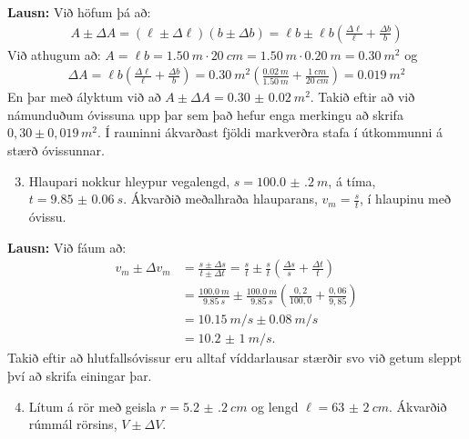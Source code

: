 \ifdefined \wholebook \else\documentclass[oneside]{book}\usepackage{EdlBook}\graphicspath{{figures/}}
\begin{document}
\textbf{Lausn:} Við höfum þá að:
\begin{align*}
    A \pm \Delta A = (\ell \pm \Delta \ell)(b \pm \Delta b) = \ell b \pm \ell b \left( \frac{\Delta \ell}{\ell} + \frac{\Delta b}{b} \right)
\end{align*}
Við athugum að: $A = \ell b = \SI{1,50}{m} \cdot \SI{20}{cm} = \SI{1,50}{m} \cdot \SI{0.20}{m} = \SI{0.30}{m^2}$ og
\begin{align*}
    \Delta A = \ell b \left( \frac{\Delta \ell}{\ell} + \frac{\Delta b}{b} \right) = \SI{0.30}{m^2} \left( \frac{\SI{0.02}{m}}{\SI{1.50}{m}} + \frac{\SI{1}{cm}}{\SI{20}{cm}} \right) = \SI{0.019}{m^2}
\end{align*}
En þar með ályktum við að $A \pm \Delta A = \SI{0.30(2)}{m^2}$. Takið eftir að við námunduðum óvissuna upp þar sem það hefur enga merkingu að skrifa $0,30 \pm 0,019 \, \si{m^2}$. Í rauninni ákvarðast fjöldi markverðra stafa í útkommunni á stærð óvissunnar.

\begin{enumerate}[label = \textbf{Sýnidæmi \thechapter.\arabic*.}]

\setcounter{enumi}{2}

\item Hlaupari nokkur hleypur vegalengd, $s = \SI{100.0(2)}{m}$, á tíma, $t = \SI{9.85(6)}{s}$. Ákvarðið meðalhraða hlauparans, $v_m = \frac{s}{t}$, í hlaupinu með óvissu.
\end{enumerate}

\textbf{Lausn:} Við fáum að:
\begin{align*}
    v_m \pm \Delta v_m &= \frac{s \pm \Delta s}{t \pm \Delta t}  = \frac{s}{t} \pm \frac{s}{t}\left( \frac{\Delta s}{s} + \frac{\Delta t}{t} \right) \\
    &= \frac{\SI{100.0}{m}}{\SI{9.85}{s}} \pm \frac{\SI{100.0}{m}}{\SI{9.85}{s}}\left( \frac{0,2}{100,0} + \frac{0,06}{9,85} \right) \\
    &= \SI{10.15}{m/s} \pm \SI{0.08}{m/s} \\
    &= \SI{10,2(1)}{m/s}.
\end{align*}
Takið eftir að hlutfallsóvissur eru alltaf víddarlausar stærðir svo við getum sleppt því að skrifa einingar þar.



\begin{enumerate}[label = \textbf{Sýnidæmi \thechapter.\arabic*.}]

\setcounter{enumi}{3}

\item Lítum á rör með geisla $r = \SI{5.2(2)}{cm}$ og lengd $\ell = \SI{63(2)}{cm}$. Ákvarðið rúmmál rörsins, $V \pm \Delta V$.

\end{enumerate}
\end{document}
